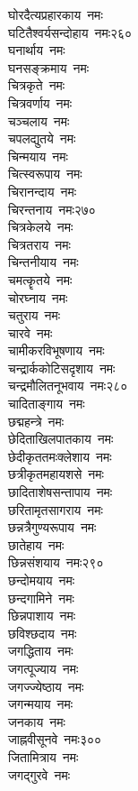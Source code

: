 \begin{multicols}{\maxColumns}
\begin{flushleft}
घोरदैत्यप्रहारकाय~नमः\\
घटितैश्वर्यसन्दोहाय~नमः\hfill २६०\\
घनार्थाय~नमः\\
घनसङ्क्रमाय~नमः\\
चित्रकृते~नमः\\
चित्रवर्णाय~नमः\\
चञ्चलाय~नमः\\
चपलद्युतये~नमः\\
चिन्मयाय~नमः\\
चित्स्वरूपाय~नमः\\
चिरानन्दाय~नमः\\
चिरन्तनाय~नमः\hfill २७०\\
चित्रकेलये~नमः\\
चित्रतराय~नमः\\
चिन्तनीयाय~नमः\\
चमत्कॄतये~नमः\\
चोरघ्नाय~नमः\\
चतुराय~नमः\\
चारवे~नमः\\
चामीकरविभूषणाय~नमः\\
चन्द्रार्ककोटिसदृशाय~नमः\\
चन्द्रमौलितनूभवाय~नमः\hfill २८०\\
चादिताङ्गाय~नमः\\
छद्महन्त्रे~नमः\\
छेदिताखिलपातकाय~नमः\\
छेदीकृततमःक्लेशाय~नमः\\
छत्रीकृतमहायशसे~नमः\\
छादिताशेषसन्तापाय~नमः\\
छरितामृतसागराय~नमः\\
छन्नत्रैगुण्यरूपाय~नमः\\
छातेहाय~नमः\\
छिन्नसंशयाय~नमः\hfill २९०\\
छन्दोमयाय~नमः\\
छन्दगामिने~नमः\\
छिन्नपाशाय~नमः\\
छविश्छदाय~नमः\\
जगद्धिताय~नमः\\
जगत्पूज्याय~नमः\\
जगज्ज्येष्ठाय~नमः\\
जगन्मयाय~नमः\\
जनकाय~नमः\\
जाह्नवीसूनवे~नमः\hfill ३००\\
जितामित्राय~नमः\\
जगद्गुरवे~नमः\\

\end{flushleft}
\end{multicols}
